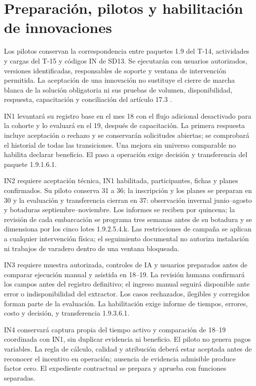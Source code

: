 \section{Preparación, pilotos y habilitación de innovaciones}
Los pilotos conservan la correspondencia entre paquetes 1.9 del T-14, actividades y cargas del T-15 y códigos IN de SD13. Se ejecutarán con usuarios autorizados, versiones identificadas, responsables de soporte y ventana de intervención permitida. La aceptación de una innovación no sustituye el cierre de marcha blanca de la solución obligatoria ni sus pruebas de volumen, disponibilidad, respuesta, capacitación y conciliación del artículo 17.3 \parencite[arts.~17--18; pp.~12--13]{bases-admin}.

IN1 levantará su registro base en el mes 18 con el flujo adicional desactivado para la cohorte y lo evaluará en el 19, después de capacitación. La primera respuesta incluye aceptación o rechazo y se conservarán solicitudes abiertas; se comprobará el historial de todas las transiciones. Una mejora sin universo comparable no habilita declarar beneficio. El paso a operación exige decisión y transferencia del paquete 1.9.1.6.1.

IN2 requiere aceptación técnica, IN1 habilitada, participantes, fichas y planes confirmados. Su piloto conserva 31 a 36; la inscripción y los planes se preparan en 30 y la evaluación y transferencia cierran en 37: observación invernal junio--agosto y botaduras septiembre--noviembre. Los informes se reciben por quincena; la revisión de cada embarcación se programa tres semanas antes de su botadura y se dimensiona por los cinco lotes 1.9.2.5.4.k. Las restricciones de campaña se aplican a cualquier intervención física; el seguimiento documental no autoriza instalación ni trabajos de varadero dentro de una ventana bloqueada.

IN3 requiere muestra autorizada, controles de IA y usuarios preparados antes de comparar ejecución manual y asistida en 18--19. La revisión humana confirmará los campos antes del registro definitivo; el ingreso manual seguirá disponible ante error o indisponibilidad del extractor. Los casos rechazados, ilegibles y corregidos forman parte de la evaluación. La habilitación exige informe de tiempos, errores, costo y decisión, y transferencia 1.9.3.6.1.

IN4 conservará captura propia del tiempo activo y comparación de 18--19 coordinada con IN1, sin duplicar evidencia ni beneficio. El piloto no genera pagos variables. La regla de cálculo, calidad y atribución deberá estar aceptada antes de reconocer el incentivo en operación; ausencia de evidencia admisible produce factor cero. El expediente contractual se prepara y aprueba con funciones separadas.

